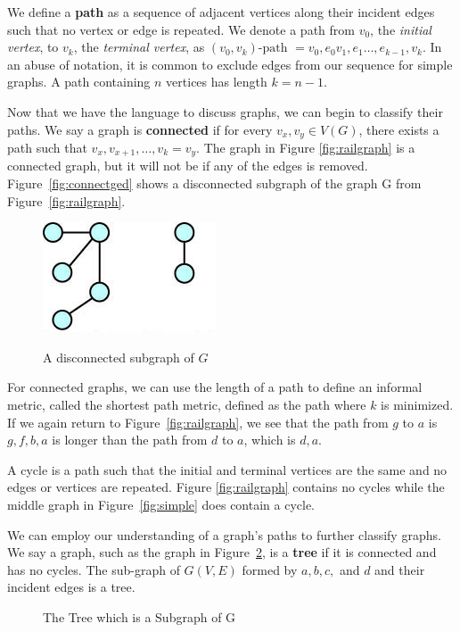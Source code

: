 \documentclass[12pt,oneside]{amsbook}
\begin{document}
We define a \textbf{path} as a sequence of adjacent vertices along their incident edges such that no vertex or edge is repeated. We denote a path from $v_0$, the \textit{initial vertex}, to $v_k$, the \textit{terminal vertex}, as $(v_0,v_k)\text{-path }=v_0,e_0v_1,e_1\dots,e_{k-1},v_k$. In an abuse of notation, it is common to exclude edges from our sequence for simple graphs. A path containing $n$ vertices has length $k=n-1$.



Now that we have the language to discuss graphs, we can begin to classify their paths. We say a graph is \textbf{connected} if for every $v_x,v_y \in V(G)$, there exists a path such that $v_x,v_{x+1},\dots, v_{k}=v_y$. The graph in Figure \ref{fig:railgraph} is a connected graph, but it will not be if any of the edges is removed. Figure~\ref{fig:connectged} shows a disconnected subgraph of the graph G from Figure~\ref{fig:railgraph}.
\begin{figure}[h]
\centering
\caption{A disconnected subgraph of $G$}
\includegraphics[scale=.5]{connected.jpg}
\label{fig:connected}
\end{figure}

For connected graphs, we can use the length of a path to define an informal metric, called the shortest path metric, defined as the path where $k$ is minimized. If we again return to Figure~\ref{fig:railgraph}, we see that the path from $g$ to $a$ is $g,f,b,a$ is longer than the path from $d$ to $a$, which is $d, a$.

A cycle is a path such that the initial and terminal vertices are the same and no edges or vertices are repeated. Figure \ref{fig:railgraph} contains no cycles while the middle graph in Figure~\ref{fig:simple} does contain a cycle.



We can employ our understanding of a graph's paths to further classify graphs. We say a graph, such as the graph in Figure~\ref{fig:tree}, is a \textbf{tree} if it is connected and has no cycles. The sub-graph of $G(V,E)$ formed by $a,b,c,$ and $d$ and their incident edges is a tree.

\begin{figure}[h]
\caption{The Tree which is a Subgraph of G}\label{fig:tree}
\centering
{}
\end{figure}
\end{document}
